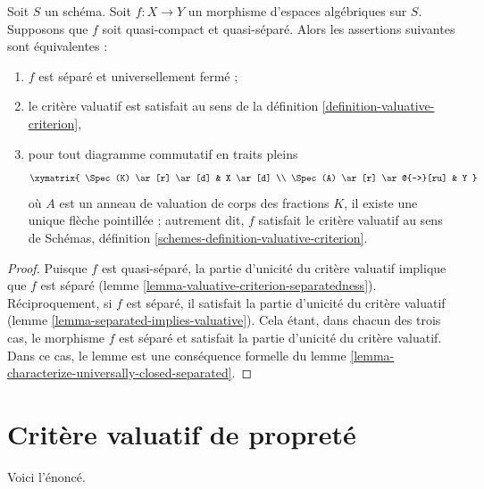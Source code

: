 \begin{lemma}
\label{lemma-characterize-separated-and-universally-closed}
Soit $S$ un schéma. Soit $f : X \to Y$ un morphisme d'espaces algébriques
sur $S$. Supposons que $f$ soit quasi-compact et quasi-séparé. Alors les
assertions suivantes sont équivalentes :
\begin{enumerate}
\item $f$ est séparé et universellement fermé ;
\item le critère valuatif est satisfait au sens de la définition
\ref{definition-valuative-criterion},
\item pour tout diagramme commutatif en traits pleins
$$
\xymatrix{
\Spec(K) \ar[r] \ar[d] & X \ar[d] \\
\Spec(A) \ar[r] \ar@{-->}[ru] & Y
}
$$
où $A$ est un anneau de valuation de corps des fractions $K$, il existe
une unique flèche pointillée ; autrement dit, $f$ satisfait le critère
valuatif au sens de
Schémas, définition \ref{schemes-definition-valuative-criterion}.
\end{enumerate}
\end{lemma}

\begin{proof}
Puisque $f$ est quasi-séparé, la partie d'unicité
du critère valuatif implique que $f$ est séparé
(lemme \ref{lemma-valuative-criterion-separatedness}).
Réciproquement, si $f$ est séparé, il satisfait la
partie d'unicité du critère valuatif
(lemme \ref{lemma-separated-implies-valuative}).
Cela étant, dans chacun des trois cas, le
morphisme $f$ est séparé et satisfait la partie d'unicité
du critère valuatif. Dans ce cas, le lemme est une conséquence
formelle du
lemme \ref{lemma-characterize-universally-closed-separated}.
\end{proof}



\section{Critère valuatif de propreté}
\label{section-valuative-criterion-properness}

\noindent
Voici l'énoncé.

